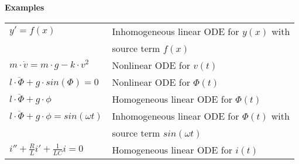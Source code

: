\textbf{Examples}\\
\begin{tabular}{ll}
  $y' = f(x)$ & Inhomogeneous linear ODE for $y(x)$ with\\
  & source term $f(x)$\\
  $m \cdot \dot{v} = m \cdot g - k \cdot v^2$ & Nonlinear ODE for $v(t)$\\
  $l \cdot \ddot{\Phi} + g \cdot sin(\Phi) = 0$ & Nonlinear ODE for $\Phi(t)$\\
  $l \cdot \ddot{\Phi} + g \cdot \phi$ & Homogeneous linear ODE for $\Phi(t)$\\
  $l \cdot \ddot{\Phi} + g \cdot \phi = sin(\omega t)$ & Inhomogeneous linear ODE for $\Phi(t)$ with\\
  & source term $sin(\omega t)$\\
  $i''+ \frac{R}{L}i' + \frac{1}{LC}i = 0$ & Homogeneous linear ODE for $i(t)$
\end{tabular}
